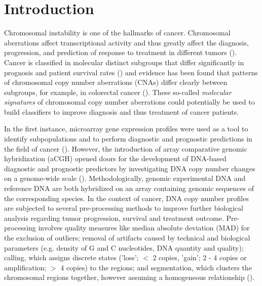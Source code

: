 \section{Introduction}
    Chromosomal instability is one of the hallmarks of cancer. Chromosomal aberrations affect transcriptional activity and thus greatly affect the diagnosis, progression, and prediction of response to treatment in different tumors (\citealp{Kloosterman2014}). Cancer is classified in molecular distinct subgroups that differ significantly in prognosis and patient survival rates (\citealp{VantVeer2002}) and evidence has been found that patterns of chromosomal copy number aberrations (CNAs) differ clearly between subgroups, for example, in colorectal cancer (\citealp{VanDenBroek2015}). These so-called \textit{molecular signatures} of chromosomal copy number aberrations could potentially be used to build classifiers to improve diagnosis and thus treatment of cancer patients.

    In the first instance, microarray gene expression profiles were used as a tool to identify subpopulations and to perform diagnostic and prognostic predictions in the field of cancer (\citealp{VantVeer2002}). However,  the introduction of array comparative genomic hybridization (aCGH) opened doors for the development of DNA-based diagnostic and prognostic predictors by investigating DNA copy number changes on a genome-wide scale (\citealp{Redon2009}). Methodologically, genomic experimental DNA and reference DNA are both hybridized on an array containing genomic sequences of the corresponding species. In the context of cancer, DNA copy number profiles are subjected to several pre-processing methods to improve further biological analysis regarding tumor progression, survival and treatment outcome. Pre-processing involves quality measures like median absolute deviation (MAD) for the exclusion of outliers; removal of artifacts caused by technical and biological parameters (e.g. density of G and C nucleotides, DNA quantity and quality); calling, which assigns discrete states ('loss'; $<$ 2 copies, 'gain'; 2 - 4 copies or amplification; $>$ 4 copies) to the regions; and segmentation, which clusters the chromosomal regions together, however assuming a homogeneous relationship (\citealp{VandeWiel2011}).

